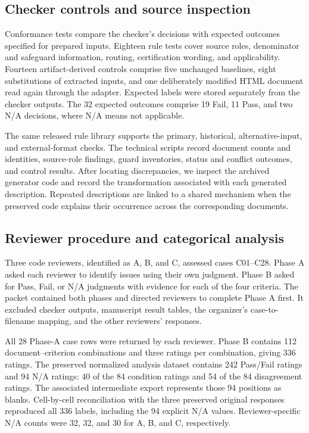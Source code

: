 \documentclass[a4paper,fleqn]{cas-dc}
\begin{document}
\subsection{Checker controls and source inspection}
Conformance tests compare the checker's decisions with expected outcomes specified for prepared inputs. Eighteen rule tests cover source roles, denominator and safeguard information, routing, certification wording, and applicability. Fourteen artifact-derived controls comprise five unchanged baselines, eight substitutions of extracted inputs, and one deliberately modified HTML document read again through the adapter. Expected labels were stored separately from the checker outputs. The 32 expected outcomes comprise 19 Fail, 11 Pass, and two N/A decisions, where N/A means not applicable.

The same released rule library supports the primary, historical, alternative-input, and external-format checks. The technical scripts record document counts and identities, source-role findings, guard inventories, status and conflict outcomes, and control results. After locating discrepancies, we inspect the archived generator code and record the transformation associated with each generated description. Repeated descriptions are linked to a shared mechanism when the preserved code explains their occurrence across the corresponding documents.

\subsection{Reviewer procedure and categorical analysis}
Three code reviewers, identified as A, B, and C, assessed cases C01--C28. Phase A asked each reviewer to identify issues using their own judgment. Phase B asked for Pass, Fail, or N/A judgments with evidence for each of the four criteria. The packet contained both phases and directed reviewers to complete Phase A first. It excluded checker outputs, manuscript result tables, the organizer's case-to-filename mapping, and the other reviewers' responses.

All 28 Phase-A case rows were returned by each reviewer. Phase B contains 112 document--criterion combinations and three ratings per combination, giving 336 ratings. The preserved normalized analysis dataset contains 242 Pass/Fail ratings and 94 N/A ratings: 40 of the 84 condition ratings and 54 of the 84 disagreement ratings. The associated intermediate export represents those 94 positions as blanks. Cell-by-cell reconciliation with the three preserved original responses reproduced all 336 labels, including the 94 explicit N/A values. Reviewer-specific N/A counts were 32, 32, and 30 for A, B, and C, respectively.
\end{document}
